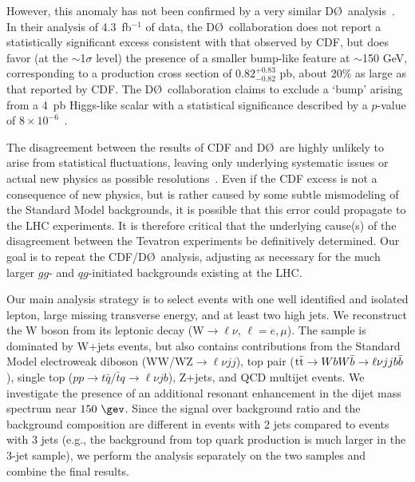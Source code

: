 \par
However, this anomaly has not been confirmed
by a very similar D\O\ analysis~\cite{d0_paper}.
In their analysis of 4.3~fb$^{-1}$ of data, the D\O\ collaboration 
does not report a statistically significant excess consistent with 
that observed by CDF, but does favor (at the $\sim$1$\sigma$ level) 
the presence of a smaller bump-like feature at $\sim$150 GeV, 
corresponding to a production cross section of 
$0.82^{+0.83}_{-0.82}$ pb, about 20\% as large as that reported 
by CDF. The D\O\ collaboration claims to exclude a `bump' arising 
from a 4~pb Higgs-like scalar with a statistical significance 
described by a $p$-value of $8\times 10^{-6}$~\cite{d0_paper}. 

The disagreement between the 
results of CDF and D\O\ are highly unlikely to arise from 
statistical fluctuations, leaving only underlying systematic 
issues or actual new physics as possible 
resolutions~\cite{BuckleyHooperMartin}. Even if 
the CDF excess is not a consequence of new physics, but is rather 
caused by some subtle mismodeling of the Standard Model backgrounds, 
it is possible that this error could propagate to the LHC experiments. 
It is therefore critical that the underlying cause(s) of the 
disagreement between the Tevatron experiments be definitively 
determined. 
Our goal is to repeat the CDF/D\O\ analysis, adjusting as necessary
for the much larger $gg$- and $qg$-initiated backgrounds existing
at the LHC.



\par
Our main analysis strategy is to select events with one well 
identified and isolated lepton, 
large missing transverse energy, and at least two high \pt jets.
We reconstruct the W boson from its leptonic decay 
(W$\to\ell\nu$, $\ell=e,\mu$).
The sample is dominated by W+jets events, but also contains 
contributions from the Standard Model electroweak diboson 
(WW/WZ$\to\ell\nu{}jj$), top pair ($\mathrm{t}\bar{\mathrm{t}}\to WbW\bar{b}\to\ell\nu jjb\bar{b}$), 
single top ($pp\to t\bar{q}/\bar{t}q\to\ell\nu jb$), Z+jets, 
and QCD multijet events. 
We investigate the presence of an additional resonant enhancement 
in the dijet mass spectrum near $150~\gev$. 
Since the signal over background ratio and the background 
composition are different in events with 2 jets compared to 
events with 3 jets (e.g., the background from top quark production is much 
larger in the 3-jet sample), we  perform the analysis 
separately on the two samples and combine the final results.



